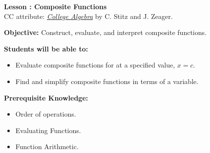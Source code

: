 \documentclass[12pt]{article}
\theoremstyle{definition}
\begin{document}
{\bf \large Lesson : Composite Functions}\label{les:composite_functions}
\\ CC attribute: \href{http://www.stitz-zeager.com}{\it{College Algebra}} by C. Stitz and J. Zeager. 
\hfill \doclicenseImage[imagewidth=5em]\\
\par
{\bf Objective:} 	Construct, evaluate, and interpret composite functions.\\
\par
{\bf Students will be able to:}
\begin{itemize}
	\item Evaluate composite functions for at a specified value, $x=c$.
	\item Find and simplify composite functions in terms of a variable.
\end{itemize}
{\bf Prerequisite Knowledge:}
\begin{itemize}
	\item Order of operations.
	\item Evaluating Functions.
	\item Function Arithmetic.
\end{itemize}
\hrulefill
\end{document}
